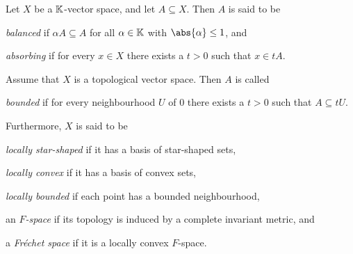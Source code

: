 \documentclass[article, a4paper, 11pt, oneside]{memoir}
\numberwithin{equation}{chapter}
\begin{document}
\begin{definition}
    Let $X$ be a $\mathbb{K}$-vector space, and let $A \subseteq X$. Then $A$ is said to be
    \begin{enumdef}
        \item \emph{balanced} if $\alpha A \subseteq A$ for all $\alpha \in \mathbb{K}$ with $\abs{\alpha} \leq 1$, and
        \item \emph{absorbing} if for every $x \in X$ there exists a $t > 0$ such that $x \in tA$.
    \end{enumdef}
    Assume that $X$ is a topological vector space. Then $A$ is called
    \begin{enumdef}[resume]
        \item \emph{bounded} if for every neighbourhood $U$ of $0$ there exists a $t > 0$ such that $A \subseteq tU$.
    \end{enumdef}
    Furthermore, $X$ is said to be
    \begin{enumdef}[resume]
        \item \emph{locally star-shaped} if it has a basis of star-shaped sets,
        \item \emph{locally convex} if it has a basis of convex sets,
        \item \emph{locally bounded} if each point has a bounded neighbourhood,
        \item an \emph{$F$-space} if its topology is induced by a complete invariant metric, and
        \item a \emph{Fréchet space} if it is a locally convex $F$-space.
    \end{enumdef}
\end{definition}
\end{document}
